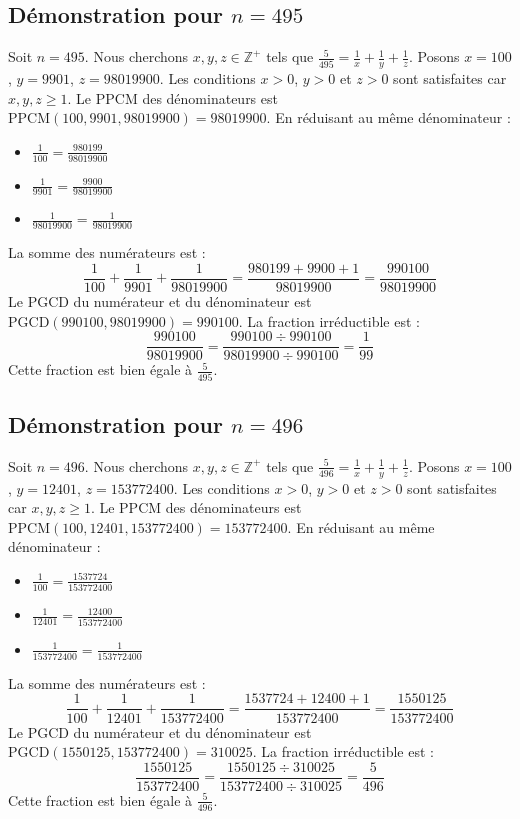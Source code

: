 \documentclass[11pt,a4paper]{article}
\begin{document}
\subsection{Démonstration pour $n = 495$}
Soit $n = 495$. Nous cherchons $x, y, z \in \mathbb{Z}^{+}$ tels que $\frac{5}{495} = \frac{1}{x} + \frac{1}{y} + \frac{1}{z}$.
Posons $x = 100$, $y = 9901$, $z = 98019900$.
Les conditions $x > 0$, $y > 0$ et $z > 0$ sont satisfaites car $x, y, z \geq 1$.
Le PPCM des dénominateurs est $\text{PPCM}(100, 9901, 98019900) = 98019900$.
En réduisant au même dénominateur :
\begin{itemize}
    \item $\frac{1}{100} = \frac{980199}{98019900}$
    \item $\frac{1}{9901} = \frac{9900}{98019900}$
    \item $\frac{1}{98019900} = \frac{1}{98019900}$
\end{itemize}
La somme des numérateurs est :
$$ \frac{1}{100} + \frac{1}{9901} + \frac{1}{98019900} = \frac{980199 + 9900 + 1}{98019900} = \frac{990100}{98019900} $$
Le PGCD du numérateur et du dénominateur est $\text{PGCD}(990100, 98019900) = 990100$.
La fraction irréductible est :
$$ \frac{990100}{98019900} = \frac{990100 \div 990100}{98019900 \div 990100} = \frac{1}{99} $$
Cette fraction est bien égale à $\frac{5}{495}$.

\subsection{Démonstration pour $n = 496$}
Soit $n = 496$. Nous cherchons $x, y, z \in \mathbb{Z}^{+}$ tels que $\frac{5}{496} = \frac{1}{x} + \frac{1}{y} + \frac{1}{z}$.
Posons $x = 100$, $y = 12401$, $z = 153772400$.
Les conditions $x > 0$, $y > 0$ et $z > 0$ sont satisfaites car $x, y, z \geq 1$.
Le PPCM des dénominateurs est $\text{PPCM}(100, 12401, 153772400) = 153772400$.
En réduisant au même dénominateur :
\begin{itemize}
    \item $\frac{1}{100} = \frac{1537724}{153772400}$
    \item $\frac{1}{12401} = \frac{12400}{153772400}$
    \item $\frac{1}{153772400} = \frac{1}{153772400}$
\end{itemize}
La somme des numérateurs est :
$$ \frac{1}{100} + \frac{1}{12401} + \frac{1}{153772400} = \frac{1537724 + 12400 + 1}{153772400} = \frac{1550125}{153772400} $$
Le PGCD du numérateur et du dénominateur est $\text{PGCD}(1550125, 153772400) = 310025$.
La fraction irréductible est :
$$ \frac{1550125}{153772400} = \frac{1550125 \div 310025}{153772400 \div 310025} = \frac{5}{496} $$
Cette fraction est bien égale à $\frac{5}{496}$.
\end{document}
